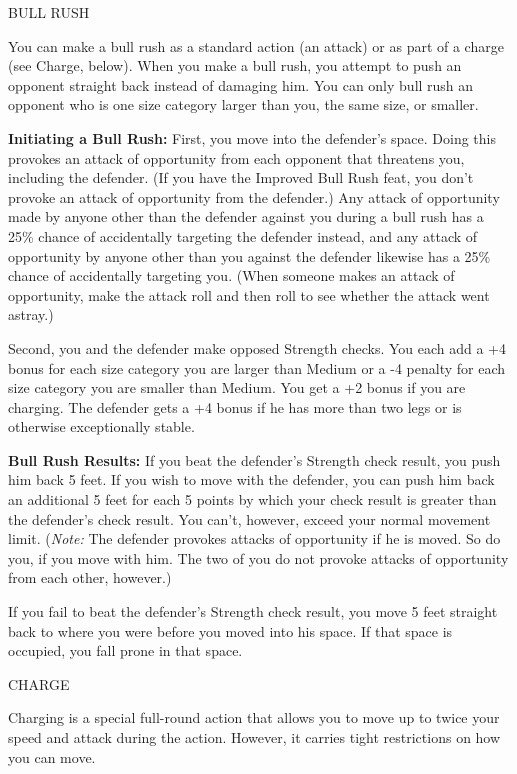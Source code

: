 \documentclass{article}
\begin{document}
\vspace{12pt}
BULL RUSH

You can make a bull rush as a standard action (an attack) or as part of a charge 
(see Charge, below). When you make a bull rush, you attempt to push an opponent 
straight back instead of damaging him. You can only bull rush an opponent who is 
one size category larger than you, the same size, or smaller.

\textbf{Initiating a Bull Rush: }First, you move into the defender's space. Doing 
this provokes an attack of opportunity from each opponent that threatens you, including 
the defender. (If you have the Improved Bull Rush feat, you don't provoke an attack 
of opportunity from the defender.) Any attack of opportunity made by anyone other 
than the defender against you during a bull rush has a 25\% chance of accidentally 
targeting the defender instead, and any attack of opportunity by anyone other than 
you against the defender likewise has a 25\% chance of accidentally targeting you. 
(When someone makes an attack of opportunity, make the attack roll and then roll 
to see whether the attack went astray.) 

Second, you and the defender make opposed Strength checks. You each add a +4 bonus 
for each size category you are larger than Medium or a -4 penalty for each size 
category you are smaller than Medium. You get a +2 bonus if you are charging. The 
defender gets a +4 bonus if he has more than two legs or is otherwise exceptionally 
stable.

\textbf{Bull Rush Results:} If you beat the defender's Strength check result, you 
push him back 5 feet. If you wish to move with the defender, you can push him back 
an additional 5 feet for each 5 points by which your check result is greater than 
the defender's check result. You can't, however, exceed your normal movement limit. 
(\textit{Note: }The defender provokes attacks of opportunity if he is moved. So 
do you, if you move with him. The two of you do not provoke attacks of opportunity 
from each other, however.)

If you fail to beat the defender's Strength check result, you move 5 feet straight 
back to where you were before you moved into his space. If that space is occupied, 
you fall prone in that space.

\vspace{12pt}
CHARGE

Charging is a special full-round action that allows you to move up to twice your 
speed and attack during the action. However, it carries tight restrictions on how 
you can move.
\end{document}
